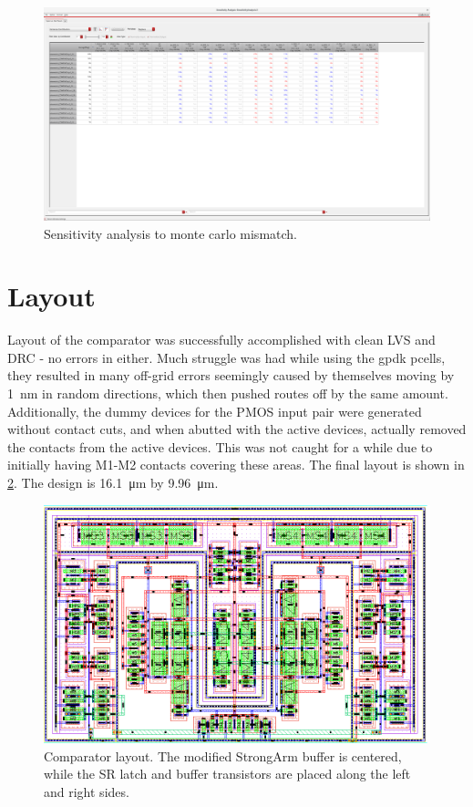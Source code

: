 \documentclass[11pt,letterpaper]{article}
\begin{document}
\begin{figure}[t!]
    \centering
    \includegraphics[width=\textwidth]{images/mc sensitivity analysis 1.png}
    \caption{Sensitivity analysis to monte carlo mismatch.}
    \label{fig:sense-results}
\end{figure}

\section{Layout}

Layout of the comparator was successfully accomplished with clean LVS and DRC - no errors in either. Much struggle was had while using the gpdk pcells, they resulted in many off-grid errors seemingly caused by themselves moving by \qty{1}{\nm} in random directions, which then pushed routes off by the same amount. Additionally, the dummy devices for the PMOS input pair were generated without contact cuts, and when abutted with the active devices, actually removed the contacts from the active devices. This was not caught for a while due to initially having M1-M2 contacts covering these areas. The final layout is shown in \cref{fig:layout}. The design is \qty{16.1}{\um} by \qty{9.96}{\um}.

\begin{figure}[!t]
    \centering
    \includegraphics[width=\textwidth]{images/layout.eps}
    \caption{Comparator layout. The modified StrongArm buffer is centered, while the SR latch and buffer transistors are placed along the left and right sides.}
    \label{fig:layout}
\end{figure}
\end{document}
